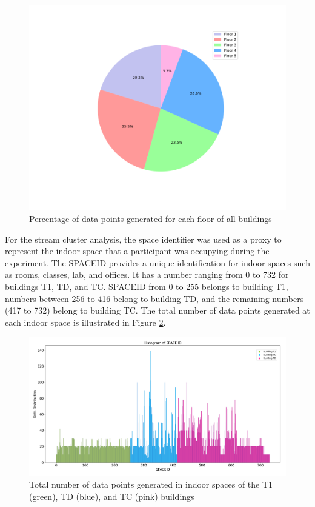 \begin{figure}[!ht]
    \centering
    \includegraphics[width = 12 cm]{image/Chapters/Chapter6/floors.png}
    \caption{Percentage of data points generated for each floor of all buildings}
    \label{Pfloor}
\end{figure} 

For the stream cluster analysis, the space identifier was used as a proxy to represent the indoor space that a participant was occupying during the experiment. The SPACEID provides a unique identification for indoor spaces such as rooms, classes, lab, and offices. It has a number ranging from 0 to 732 for  buildings T1, TD, and TC. SPACEID from 0 to 255 belongs to building T1, numbers between 256 to 416 belong to building TD, and the remaining numbers (417 to 732) belong to building TC. The total number of data points generated at each indoor space is illustrated in Figure \ref{spaceiduniq }. 

\begin{figure}[ht]
    \centering
    \includegraphics[width = 16 cm]{image/Chapters/Chapter6/uniqspaceid.png}
    \caption{ Total number of data points generated in indoor spaces of the T1 (green), TD (blue), and TC (pink) buildings}
    \label{spaceiduniq }
\end{figure}

